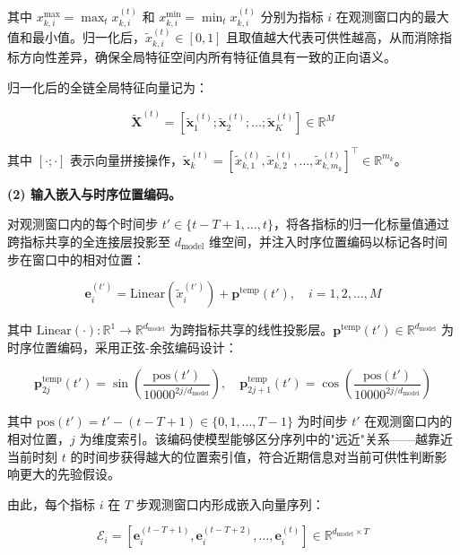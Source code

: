 其中 $x_{k,i}^{\max}=\max_t x_{k,i}^{(t)}$ 和 $x_{k,i}^{\min}=\min_t x_{k,i}^{(t)}$ 分别为指标 $i$ 在观测窗口内的最大值和最小值。归一化后，$\tilde{x}_{k,i}^{(t)}\in[0,1]$ 且取值越大代表可供性越高，从而消除指标方向性差异，确保全局特征空间内所有特征值具有一致的正向语义。

归一化后的全链全局特征向量记为：

\begin{equation}
\tilde{\mathbf{X}}^{(t)} = [\tilde{\mathbf{x}}_1^{(t)}; \tilde{\mathbf{x}}_2^{(t)}; \ldots; \tilde{\mathbf{x}}_K^{(t)}] \in \mathbb{R}^{M}
\end{equation}

其中 $[\cdot;\cdot]$ 表示向量拼接操作，$\tilde{\mathbf{x}}_k^{(t)}=[\tilde{x}_{k,1}^{(t)},\tilde{x}_{k,2}^{(t)},\ldots,\tilde{x}_{k,m_k}^{(t)}]^{\top}\in\mathbb{R}^{m_k}$。

\textbf{(2) 输入嵌入与时序位置编码。}

对观测窗口内的每个时间步 $t' \in \{t-T+1,\ldots,t\}$，将各指标的归一化标量值通过跨指标共享的全连接层投影至 $d_{\text{model}}$ 维空间，并注入时序位置编码以标记各时间步在窗口中的相对位置：

\begin{equation}
\mathbf{e}_i^{(t')} = \text{Linear}\left(\tilde{x}_i^{(t')}\right) + \mathbf{p}^{\text{temp}}(t'), \quad i=1,2,\ldots,M
\end{equation}

其中 $\text{Linear}(\cdot):\mathbb{R}^{1}\to\mathbb{R}^{d_{\text{model}}}$ 为跨指标共享的线性投影层。$\mathbf{p}^{\text{temp}}(t')\in\mathbb{R}^{d_{\text{model}}}$ 为时序位置编码，采用正弦-余弦编码设计：

\begin{equation}
\mathbf{p}_{2j}^{\text{temp}}(t') = \sin\left(\frac{\text{pos}(t')}{10000^{2j/d_{\text{model}}}}\right), \quad
\mathbf{p}_{2j+1}^{\text{temp}}(t') = \cos\left(\frac{\text{pos}(t')}{10000^{2j/d_{\text{model}}}}\right)
\end{equation}

其中 $\text{pos}(t') = t' - (t-T+1) \in \{0,1,\ldots,T-1\}$ 为时间步 $t'$ 在观测窗口内的相对位置，$j$ 为维度索引。该编码使模型能够区分序列中的"远近"关系——越靠近当前时刻 $t$ 的时间步获得越大的位置索引值，符合近期信息对当前可供性判断影响更大的先验假设。

由此，每个指标 $i$ 在 $T$ 步观测窗口内形成嵌入向量序列：

\begin{equation}
\mathcal{E}_i = \left[\mathbf{e}_i^{(t-T+1)},\mathbf{e}_i^{(t-T+2)},\ldots,\mathbf{e}_i^{(t)}\right] \in \mathbb{R}^{d_{\text{model}} \times T}
\end{equation}

